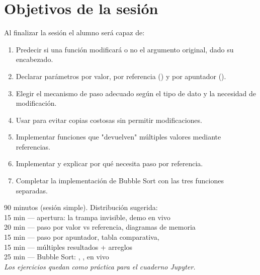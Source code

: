 \documentclass[12pt, oneside]{article}
\begin{document}

\tableofcontents
\newpage

\section{Objetivos de la sesión}

Al finalizar la sesión el alumno será capaz de:

\begin{enumerate}
  \item Predecir si una función modificará o no el argumento original, dado su encabezado.
  \item Declarar parámetros por valor, por referencia () y por apuntador ().
  \item Elegir el mecanismo de paso adecuado según el tipo de dato y la necesidad de modificación.
  \item Usar  para evitar copias costosas sin permitir modificaciones.
  \item Implementar funciones que "devuelven" múltiples valores mediante referencias.
  \item Implementar  y explicar por qué necesita paso por referencia.
  \item Completar la implementación de Bubble Sort con las tres funciones separadas.
\end{enumerate}

\begin{notaprofesor}
  90 minutos (sesión simple). Distribución sugerida:\\
  15 min — apertura: la trampa invisible, demo en vivo \\
  20 min — paso por valor vs referencia, diagramas de memoria \\
  15 min — paso por apuntador, tabla comparativa,  \\
  15 min — múltiples resultados + arreglos \\
  25 min — Bubble Sort: , ,  en vivo \\
  \textit{Los ejercicios quedan como práctica para el cuaderno Jupyter.}
\end{notaprofesor}

\end{document}
